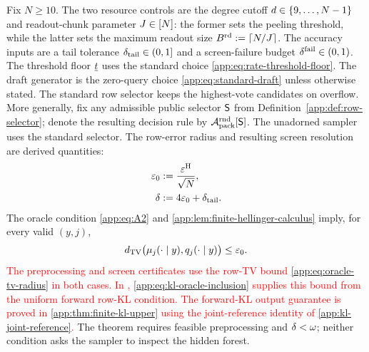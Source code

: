 Fix $N\ge10$.  The two resource controls are the degree cutoff
$\DegreeCutoff\in\{9,\ldots,N-1\}$ and readout-chunk parameter
$\ChunkCount\in\PositionSet$: the former sets the peeling threshold, while
the latter sets the maximum readout size
$\ReadoutChunkSize:=\lceil N/\ChunkCount\rceil$.
The accuracy inputs are a tail tolerance $\TailTolerance\in(0,1]$ and a
screen-failure budget $\ScreenFailureBudget\in(0,1)$.
The threshold floor $\ThresholdFloor$ uses the standard choice
\eqref{app:eq:rate-threshold-floor}.
The draft generator is the zero-query choice
\eqref{app:eq:standard-draft} unless otherwise stated.
The standard row selector keeps the highest-vote candidates on overflow.
More generally, fix any admissible public selector $\RowSelector$ from
Definition~\ref{app:def:row-selector}; denote the resulting decision rule by
$\SelectedPackedSampler$.  The unadorned sampler uses the standard selector.
The row-error radius and resulting screen resolution are derived quantities:
\begin{align}
 \RowTVError&:=\frac{\OracleRadius}{\sqrt N},
 \label{app:eq:oracle-tv-radii}\\
 \ScreenResolution&:=4\RowTVError+\TailTolerance.
 \label{app:eq:diameter-screen-resolution}
\end{align}
The oracle condition \eqref{app:eq:A2} and
\cref{app:lem:finite-hellinger-calculus} imply, for every valid $(y,j)$,
\begin{equation}
 \dTV\bigl(\ExactRow{y}{j},\OracleRow{y}{j}\bigr)
 \le\RowTVError.
 \label{app:eq:oracle-tv-radius}
\end{equation}
\textcolor{red}{The preprocessing and screen certificates use the row-TV bound
\eqref{app:eq:oracle-tv-radius} in both cases.  In \KLCase,
\eqref{app:eq:kl-oracle-inclusion} supplies this bound from the uniform
forward row-KL condition.  The forward-KL output guarantee is proved in
\cref{app:thm:finite-kl-upper} using the joint-reference identity of
\cref{app:kl-joint-reference}.}
The theorem requires feasible preprocessing and
$\ScreenResolution<\EdgeSignal$; neither condition asks the sampler to inspect
the hidden forest.

